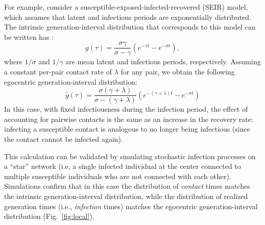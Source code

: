 \documentclass[12pt]{article}
\newcommand{\fref}[1]{Fig.~\ref{fig:#1}}
\begin{document}
For example, consider a susceptible-exposed-infected-recovered (SEIR) model, which assumes that latent and infectious periods are exponentially distributed.
The intrinsic generation-interval distribution that corresponds to this model can be written has \citep{svensson2015influence}:
\begin{equation}
g(\tau) = \frac{\sigma \gamma}{\sigma - \gamma} \left(e^{-\gamma t} - e^{-\sigma t}\right),
\end{equation}
where $1/\sigma$ and $1/\gamma$ are mean latent and infectious periods, respectively.
Assuming a constant per-pair contact rate of $\lambda$ for any pair, we obtain the following egocentric generation-interval distribution:
\begin{equation}
\hat{g}(\tau) = \frac{\sigma (\gamma + \lambda)}{\sigma - (\gamma + \lambda)} \left(e^{-(\gamma + \lambda)t} - e^{-\sigma t}\right)
\end{equation}
In this case, with fixed infectiousness during the infection period, the effect of accounting for pairwise contacts is the same as an increase in the recovery rate: infecting a susceptible contact is analogous to no longer being infectious (since the contact cannot be infected again). 

This calculation can be validated by simulating stochastic infection processes on a ``star'' network (i.e, a single infected individual at the center connected to multiple susceptible individuals who are not connected with each other).
Simulations confirm that in this case the distribution of \emph{contact} times matches the intrinsic generation-interval distribution, while the distribution of realized generation times (i.e., \emph{infection} times) matches the egocentric generation-interval distribution (\fref{local}).
\end{document}
